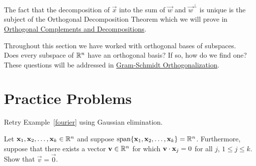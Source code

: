 \documentclass{ximera}
\begin{document}
The fact that the decomposition of $\vec{x}$ into the sum of $\vec{w}$ and $\vec{w}^\perp$ is unique is the subject of the Orthogonal Decomposition Theorem which we will prove in \href{https://ximera.osu.edu/linearalgebradzv3/LinearAlgebraInteractiveIntro/RTH-0020/main}{Orthogonal Complements and Decompositions}.

Throughout this section we have worked with orthogonal bases of subspaces.  Does every subspace of $\mathbb{R}^n$ have an orthogonal basis?  If so, how do we find one?  These questions will be addressed in \href{https://ximera.osu.edu/linearalgebradzv3/LinearAlgebraInteractiveIntro/RTH-0015/main}{Gram-Schmidt Orthogonalization}.

\section*{Practice Problems}
\begin{problem}\label{prob:rref_way}
Retry Example~\ref{fourier} using Gaussian elimination.  %
\end{problem}

\begin{problem}\label{prob:vec_eq_0}
    Let $\mathbf{x}_1, \mathbf{x}_2, \ldots, \mathbf{x}_k\in\mathbb{R}^n$ and
suppose $\mbox{span}\{\mathbf{x}_1, \mathbf{x}_2, \ldots, \mathbf{x}_k\}=\mathbb{R}^n$.
Furthermore, suppose that there exists a vector $\mathbf{v}\in\mathbb{R}^n$ for which $\mathbf{v}\cdot \mathbf{x}_j=0$ for all $j$, $1\leq j\leq k$.
Show that $\vec{v}=\vec{0}$.
\end{problem}
\end{document}
